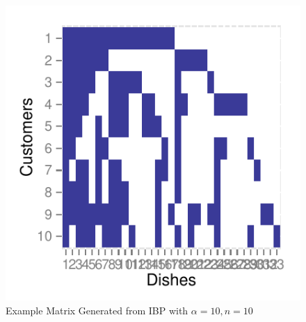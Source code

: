 \documentclass[12pt,letterpaper]{article}
\begin{document}
\begin{figure}[h!]
\begin{center}
\includegraphics{alpha10n10.pdf}
\caption{Example Matrix Generated from IBP with $\alpha=10, n=10$}
\label{alpha10n10}
\end{center}
\end{figure}
\end{document}
